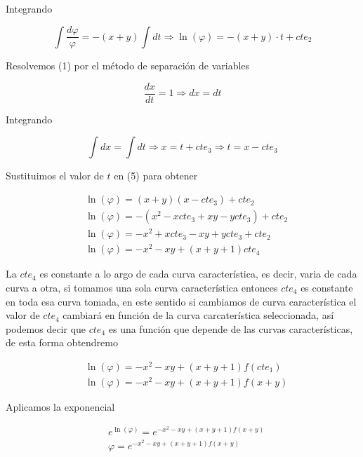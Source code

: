 \documentclass{article}
\begin{document}
\begin{enumerate}
					Integrando
						
						\begin{equation}
							\int \frac{d\varphi}{\varphi} =-(x+y) \int dt \Longrightarrow \ln (\varphi) = -(x+y)\cdot t+ cte_2
						\end{equation}
					
					Resolvemos (1) por el método de separación de variables 
						
						\begin{equation*}
							\frac{dx}{dt} =1 \Longrightarrow dx=dt 
						\end{equation*}						 
					
					Integrando
						
						\begin{equation*}
							\int dx =\int dt \Longrightarrow x=t+cte_3 \Longrightarrow t=x-cte_3
						\end{equation*}
					
					Sustituimos el valor de $t$ en (5) para obtener
						
						\begin{align*}
							&\ln (\varphi) =(x+y)(x-cte_3)+cte_2\\
							&\ln (\varphi) =-(x^2-xcte_3+xy-ycte_3)+cte_2\\
							&\ln (\varphi) =-x^2+xcte_3-xy+ycte_3+cte_2\\
							&\ln (\varphi) = -x^2-xy+(x+y+1)cte_4
						\end{align*}						 
					
					La $cte_4$ es constante a lo argo de cada curva característica, es decir, varia de cada curva a otra, si tomamos una 						sola curva característica entonces $cte_4$ es constante en toda esa curva tomada, en este sentido si cambiamos de 							curva característica el valor de $cte_4$ cambiará en función de la curva carcaterística seleccionada, así podemos 							decir que $cte_4$ es una función que depende de las curvas características, de esta forma obtendremo
						
						\begin{align*}
							&\ln (\varphi) = -x^2-xy+(x+y+1)f(cte_1)\\
							&\ln (\varphi) = -x^2-xy +(x+y+1)f(x+y)
						\end{align*}
						
					
					Aplicamos la exponencial
						
						\begin{align*}
							&e^{\ln (\varphi)} = e^{-x^2-xy +(x+y+1)f(x+y)}\\
							&\varphi = e^{-x^2-xy +(x+y+1)f(x+y)}
						\end{align*}
					

\end{enumerate}
\end{document}
